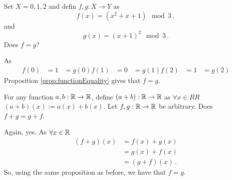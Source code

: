 \guard




\begin{exmp}
\label{exmp:functionEquality}
  Set $X = {0,1,2}$ and defin $f,g:X\to Y$ as \[ f(x) = (x^2+x+1)\mod 3\,,\] and \[ g(x) = (x+1)^2 \mod 3\,.\]
  Does $f=g$?

  As
  \begin{align*}
    f(0)  &= 1  &= g(0)
    f(1)  &= 0  &= g(1)
    f(2)  &= 1  &= g(2)
  \end{align*}
  Proposition \ref{prop:functionEquality} gives that $f=g$.


  For any function $a,b:\mathbb{R}\to\mathbb{R}$, define $(a+b):\mathbb{R}\to\mathbb{R}$ as $\forall x\in RR$ $(a+b)(x) := a(x) + b(x)$.
  Let $f,g:\mathbb{R}\to\mathbb{R}$ be arbitrary.
  Does $f+g = g+f$.

  Again, yes.
  As $\forall x\in \mathbb{R}$
  \begin{align*}
    (f+g)(x)  &= f(x) + g(x) \\
              &= g(x) + f(x) \\
              &= (g+f)(x)\,.
  \end{align*}
  So, using the same proposition as before, we have that $f=g$.
\end{exmp}
